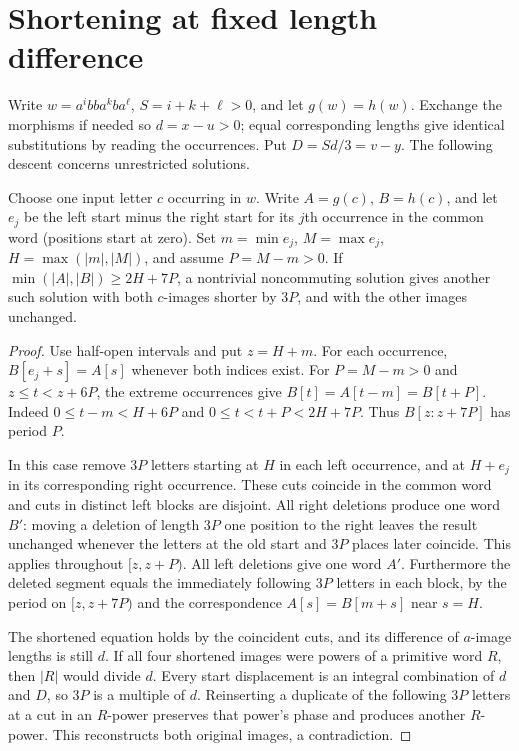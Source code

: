 \section{Shortening at fixed length difference}
Write $w=a^ibb a^kb a^\ell$, $S=i+k+\ell>0$, and let $g(w)=h(w)$.
Exchange the morphisms if needed so $d=x-u>0$; equal corresponding
lengths give identical substitutions by reading the occurrences.
Put $D=Sd/3=v-y$. The following descent concerns unrestricted solutions.

\begin{lemma}
Choose one input letter $c$ occurring in $w$. Write $A=g(c)$, $B=h(c)$,
and let $e_j$ be the left start minus the right start for its $j$th
occurrence in the common word (positions start at zero).
Set $m=\min e_j$, $M=\max e_j$, $H=\max(|m|,|M|)$,
and assume $P=M-m>0$.
If $\min(|A|,|B|)\ge 2H+7P$, a nontrivial noncommuting solution
gives another such solution with both $c$-images shorter by $3P$,
and with the other images unchanged.
\end{lemma}
\begin{proof}
Use half-open intervals and put $z=H+m$. For each occurrence,
$B[e_j+s]=A[s]$ whenever both indices exist.
For $P=M-m>0$ and $z\le t<z+6P$, the extreme occurrences give
$B[t]=A[t-m]=B[t+P]$. Indeed $0\le t-m<H+6P$
and $0\le t<t+P<2H+7P$. Thus $B[z:z+7P]$ has period $P$.

In this case remove $3P$ letters starting at $H$ in each left occurrence,
and at $H+e_j$ in its corresponding right occurrence. These cuts coincide
in the common word and cuts in distinct left blocks are disjoint.
All right deletions produce one word $B'$: moving a deletion of length
$3P$ one position to the right leaves the result unchanged whenever the
letters at the old start and $3P$ places later coincide. This applies
throughout $[z,z+P)$. All left deletions give one word $A'$.
Furthermore the deleted segment equals the immediately following $3P$
letters in each block, by the period on $[z,z+7P)$ and the correspondence $A[s]=B[m+s]$ near $s=H$.

The shortened equation holds by the coincident cuts, and its difference
of $a$-image lengths is still $d$. If all four shortened images were
powers of a primitive word $R$, then $|R|$ would divide $d$.
Every start displacement is an integral combination of $d$ and $D$,
so $3P$ is a multiple of $d$. Reinserting a duplicate of the following
$3P$ letters at a cut in an $R$-power preserves that power's phase
and produces another $R$-power. This reconstructs both original images,
a contradiction.
\end{proof}

